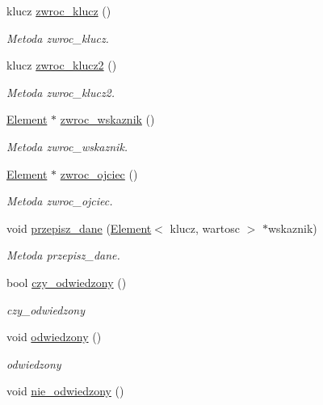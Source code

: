 \begin{DoxyCompactItemize}
\item 
klucz \hyperlink{class_element_a4041559698851d33d77d9c457f3a5da4}{zwroc\+\_\+klucz} ()
\begin{DoxyCompactList}\small\item\em Metoda zwroc\+\_\+klucz. \end{DoxyCompactList}\item 
klucz \hyperlink{class_element_a432a0f6d8a5291051644667a39a3c1ba}{zwroc\+\_\+klucz2} ()
\begin{DoxyCompactList}\small\item\em Metoda zwroc\+\_\+klucz2. \end{DoxyCompactList}\item 
\hyperlink{class_element}{Element} $\ast$ \hyperlink{class_element_acee0fb7c5bbe330961d16e6e672d07d2}{zwroc\+\_\+wskaznik} ()
\begin{DoxyCompactList}\small\item\em Metoda zwroc\+\_\+wskaznik. \end{DoxyCompactList}\item 
\hyperlink{class_element}{Element} $\ast$ \hyperlink{class_element_ac24b7bfe84763613a838012e85ad4ac4}{zwroc\+\_\+ojciec} ()
\begin{DoxyCompactList}\small\item\em Metoda zwroc\+\_\+ojciec. \end{DoxyCompactList}\item 
void \hyperlink{class_element_aacd6653f0fa6475a8b2e122dddf80627}{przepisz\+\_\+dane} (\hyperlink{class_element}{Element}$<$ klucz, wartosc $>$ $\ast$wskaznik)
\begin{DoxyCompactList}\small\item\em Metoda przepisz\+\_\+dane. \end{DoxyCompactList}\item 
bool \hyperlink{class_element_a92f1c6c72a7b768cd2d295eb6b6c3d0e}{czy\+\_\+odwiedzony} ()
\begin{DoxyCompactList}\small\item\em czy\+\_\+odwiedzony \end{DoxyCompactList}\item 
void \hyperlink{class_element_af45d4a7953e01a1d9916eed0ab17f6bb}{odwiedzony} ()
\begin{DoxyCompactList}\small\item\em odwiedzony \end{DoxyCompactList}\item 
void \hyperlink{class_element_a1091b5a9763464470901903c27fa3af4}{nie\+\_\+odwiedzony} ()

\end{DoxyCompactItemize}
